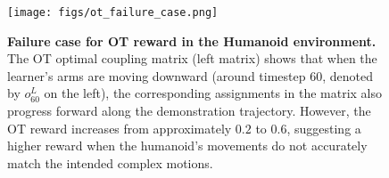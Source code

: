 \begin{figure}
    \centering
    \texttt{[image: figs/ot\_failure\_case.png]}
    \caption{\small \textbf{Failure case for OT reward in the Humanoid environment.} The OT optimal coupling matrix (left matrix) shows that when the learner's arms are moving downward (around timestep 60, denoted by $o^{L}_{60}$ on the left), the corresponding assignments in the matrix also progress forward along the demonstration trajectory. However, the OT reward increases from approximately $0.2$ to $0.6$, suggesting a higher reward when the humanoid's movements do not accurately match the intended complex motions.}
    \label{fig:ot_fail_case_app}
\end{figure}
